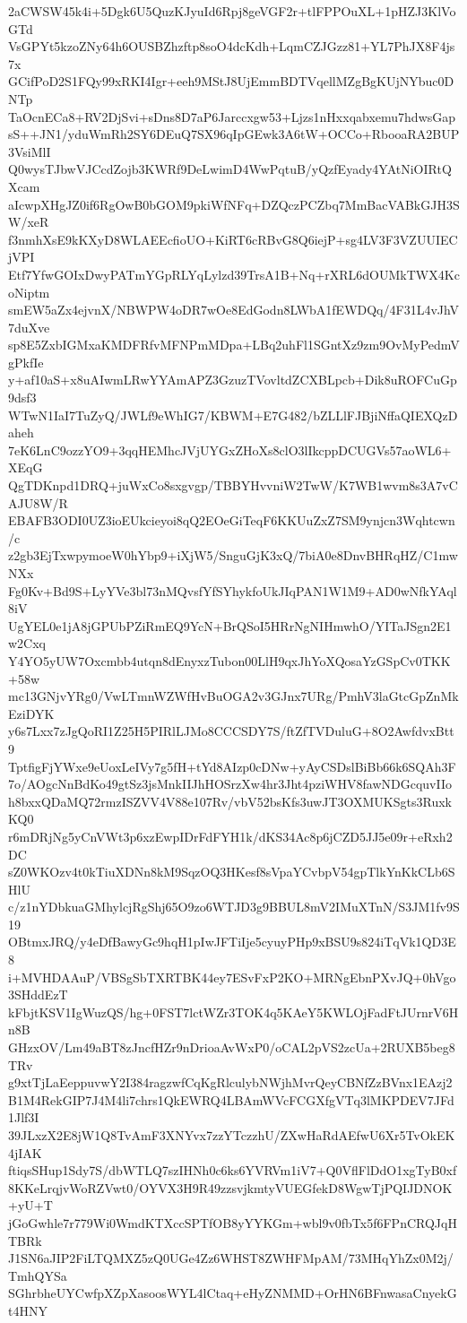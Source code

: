 2aCWSW45k4i+5Dgk6U5QuzKJyuId6Rpj8geVGF2r+tlFPPOuXL+1pHZJ3KlVoGTd
VsGPYt5kzoZNy64h6OUSBZhzftp8soO4dcKdh+LqmCZJGzz81+YL7PhJX8F4js7x
GCifPoD2S1FQy99xRKI4Igr+eeh9MStJ8UjEmmBDTVqellMZgBgKUjNYbuc0DNTp
TaOcnECa8+RV2DjSvi+sDns8D7aP6Jarccxgw53+Ljzs1nHxxqabxemu7hdwsGap
sS++JN1/yduWmRh2SY6DEuQ7SX96qIpGEwk3A6tW+OCCo+RbooaRA2BUP3VsiMlI
Q0wysTJbwVJCcdZojb3KWRf9DeLwimD4WwPqtuB/yQzfEyady4YAtNiOIRtQXcam
aIcwpXHgJZ0if6RgOwB0bGOM9pkiWfNFq+DZQczPCZbq7MmBacVABkGJH3SW/xeR
f3nmhXsE9kKXyD8WLAEEcfioUO+KiRT6cRBvG8Q6iejP+sg4LV3F3VZUUIECjVPI
Etf7YfwGOIxDwyPATmYGpRLYqLylzd39TrsA1B+Nq+rXRL6dOUMkTWX4KcoNiptm
smEW5aZx4ejvnX/NBWPW4oDR7wOe8EdGodn8LWbA1fEWDQq/4F31L4vJhV7duXve
sp8E5ZxbIGMxaKMDFRfvMFNPmMDpa+LBq2uhFl1SGntXz9zm9OvMyPedmVgPkfIe
y+af10aS+x8uAIwmLRwYYAmAPZ3GzuzTVovltdZCXBLpcb+Dik8uROFCuGp9dsf3
WTwN1IaI7TuZyQ/JWLf9eWhIG7/KBWM+E7G482/bZLLlFJBjiNffaQIEXQzDaheh
7eK6LnC9ozzYO9+3qqHEMhcJVjUYGxZHoXs8clO3lIkcppDCUGVs57aoWL6+XEqG
QgTDKnpd1DRQ+juWxCo8sxgvgp/TBBYHvvniW2TwW/K7WB1wvm8s3A7vCAJU8W/R
EBAFB3ODI0UZ3ioEUkcieyoi8qQ2EOeGiTeqF6KKUuZxZ7SM9ynjcn3Wqhtcwn/c
z2gb3EjTxwpymoeW0hYbp9+iXjW5/SnguGjK3xQ/7biA0e8DnvBHRqHZ/C1mwNXx
Fg0Kv+Bd9S+LyYVe3bl73nMQvsfYfSYhykfoUkJIqPAN1W1M9+AD0wNfkYAql8iV
UgYEL0e1jA8jGPUbPZiRmEQ9YcN+BrQSoI5HRrNgNIHmwhO/YITaJSgn2E1w2Cxq
Y4YO5yUW7Oxcmbb4utqn8dEnyxzTubon00LlH9qxJhYoXQosaYzGSpCv0TKK+58w
mc13GNjvYRg0/VwLTmnWZWfHvBuOGA2v3GJnx7URg/PmhV3laGtcGpZnMkEziDYK
y6s7Lxx7zJgQoRI1Z25H5PIRlLJMo8CCCSDY7S/ftZfTVDuluG+8O2AwfdvxBtt9
TptfigFjYWxe9eUoxLeIVy7g5fH+tYd8AIzp0cDNw+yAyCSDslBiBb66k6SQAh3F
7o/AOgcNnBdKo49gtSz3jsMnkIIJhHOSrzXw4hr3Jht4pziWHV8fawNDGcquvIIo
h8bxxQDaMQ72rmzISZVV4V88e107Rv/vbV52bsKfs3uwJT3OXMUKSgts3RuxkKQ0
r6mDRjNg5yCnVWt3p6xzEwpIDrFdFYH1k/dKS34Ac8p6jCZD5JJ5e09r+eRxh2DC
sZ0WKOzv4t0kTiuXDNn8kM9SqzOQ3HKesf8sVpaYCvbpV54gpTlkYnKkCLb6SHlU
c/z1nYDbkuaGMhylcjRgShj65O9zo6WTJD3g9BBUL8mV2IMuXTnN/S3JM1fv9S19
OBtmxJRQ/y4eDfBawyGc9hqH1pIwJFTiIje5cyuyPHp9xBSU9s824iTqVk1QD3E8
i+MVHDAAuP/VBSgSbTXRTBK44ey7ESvFxP2KO+MRNgEbnPXvJQ+0hVgo3SHddEzT
kFbjtKSV1IgWuzQS/hg+0FST7lctWZr3TOK4q5KAeY5KWLOjFadFtJUrnrV6Hn8B
GHzxOV/Lm49aBT8zJncfHZr9nDrioaAvWxP0/oCAL2pVS2zcUa+2RUXB5beg8TRv
g9xtTjLaEeppuvwY2I384ragzwfCqKgRlculybNWjhMvrQeyCBNfZzBVnx1EAzj2
B1M4RekGIP7J4M4li7chrs1QkEWRQ4LBAmWVcFCGXfgVTq3lMKPDEV7JFd1Jlf3I
39JLxzX2E8jW1Q8TvAmF3XNYvx7zzYTczzhU/ZXwHaRdAEfwU6Xr5TvOkEK4jIAK
ftiqsSHup1Sdy7S/dbWTLQ7szIHNh0c6ks6YVRVm1iV7+Q0VflFlDdO1xgTyB0xf
8KKeLrqjvWoRZVwt0/OYVX3H9R49zzsvjkmtyVUEGfekD8WgwTjPQIJDNOK+yU+T
jGoGwhle7r779Wi0WmdKTXccSPTfOB8yYYKGm+wbl9v0fbTx5f6FPnCRQJqHTBRk
J1SN6aJIP2FiLTQMXZ5zQ0UGe4Zz6WHST8ZWHFMpAM/73MHqYhZx0M2j/TmhQYSa
SGhrbheUYCwfpXZpXasoosWYL4lCtaq+eHyZNMMD+OrHN6BFnwasaCnyekGt4HNY

